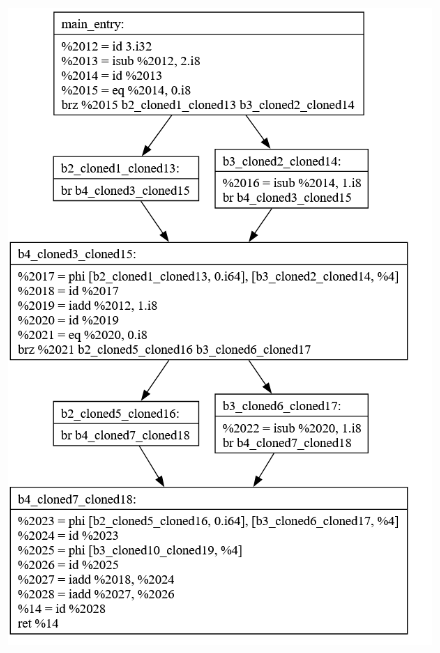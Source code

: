 \documentclass[11pt, a4paper, titlepage]{article}
\begin{document}
\begin{figure}[H]
  \centering
  \includegraphics[scale=0.3]{images/i36.png}

\end{figure}
\end{document}
